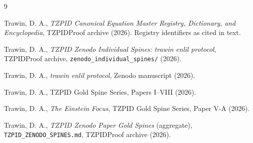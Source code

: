 \documentclass[11pt]{article}
\theoremstyle{remark}
\begin{document}
\begin{thebibliography}{9}

 Trawin, D. A., \emph{TZPID Canonical Equation Master Registry, Dictionary, and Encyclopedia}, TZPIDProof archive (2026). Registry identifiers as cited in text.

 Trawin, D. A., \emph{TZPID Zenodo Individual Spines: trawin enlil protocol}, TZPIDProof archive, \texttt{zenodo\_individual\_spines/} (2026).

 Trawin, D. A., \emph{trawin enlil protocol}, Zenodo manuscript (2026).

 Trawin, D. A., TZPID Gold Spine Series, Papers I--VIII (2026).

 Trawin, D. A., \emph{The Einstein Focus}, TZPID Gold Spine Series, Paper V-A (2026).

 Trawin, D. A., \emph{TZPID Zenodo Paper Gold Spines} (aggregate), \texttt{TZPID\_ZENODO\_SPINES.md}, TZPIDProof archive (2026).

\end{thebibliography}
\end{document}
